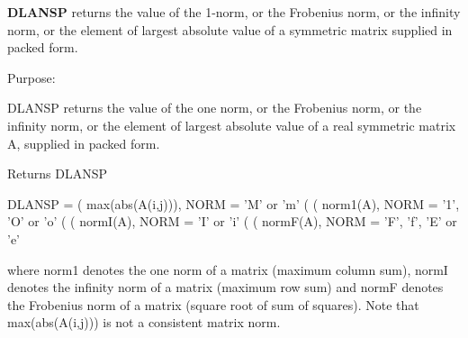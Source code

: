 {\bfseries D\+L\+A\+N\+S\+P} returns the value of the 1-\/norm, or the Frobenius norm, or the infinity norm, or the element of largest absolute value of a symmetric matrix supplied in packed form. 

 \begin{DoxyParagraph}{Purpose\+: }
\begin{DoxyVerb} DLANSP  returns the value of the one norm,  or the Frobenius norm, or
 the  infinity norm,  or the  element of  largest absolute value  of a
 real symmetric matrix A,  supplied in packed form.\end{DoxyVerb}

\end{DoxyParagraph}
\begin{DoxyReturn}{Returns}
D\+L\+A\+N\+S\+P \begin{DoxyVerb}    DLANSP = ( max(abs(A(i,j))), NORM = 'M' or 'm'
             (
             ( norm1(A),         NORM = '1', 'O' or 'o'
             (
             ( normI(A),         NORM = 'I' or 'i'
             (
             ( normF(A),         NORM = 'F', 'f', 'E' or 'e'

 where  norm1  denotes the  one norm of a matrix (maximum column sum),
 normI  denotes the  infinity norm  of a matrix  (maximum row sum) and
 normF  denotes the  Frobenius norm of a matrix (square root of sum of
 squares).  Note that  max(abs(A(i,j)))  is not a consistent matrix norm.\end{DoxyVerb}
 
\end{DoxyReturn}

